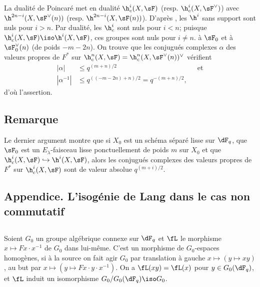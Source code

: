 La dualité de Poincaré met en dualité $\h_c^i(X,\sF)$ (resp. 
$\h_c^i(X,\sF^\vee)$) avec $\h^{2n-i}(X,\sF^\vee(n))$ (resp. 
$\h^{2n-i}(X,\sF(n))$). D'après , les $\h^i$ sans support 
sont nuls pour $i>n$. Par dualité, les $\h_c^i$ sont nuls pour $i<n$; puisque 
$\h_c^i(X,\sF) \iso \h^i(X,\sF)$, ces groupes sont nuls pour $i\ne n$. 
 à $\sF_0$ et à $\sF_0^\vee(n)$ (de poids 
$-m-2n$). On trouve que les conjugués complexes $\alpha$ des valeurs propres 
de $F^\ast$ sur $\h_c^n(X,\sF) = \h_c^n(X,\sF^\vee(n))^\vee$ vérifient 
\begin{align*}
  |\alpha| &\leqslant q^{(m+n)/2} && \text{et} \\
  |\alpha^{-1}| &\leqslant q^{((-m-2n)+n)/2} = q^{-(m+n)/2} \text{,}
\end{align*}
d'où l'assertion. 





\subsection{Remarque}\label{VI:1-21}

Le dernier argument montre que si $X_0$ est un schéma séparé lisse sur 
$\dF_q$, que $\sF_0$ est un $E_\lambda$-faisceau lisse ponctuellement de poids 
$m$ sur $X_0$ et que $\h_c^i(X,\sF) \hookrightarrow \h^i(X,\sF)$, alors les 
conjugués complexes des valeurs propres de $F^\ast$ sur $\h_c^i(X,\sF)$ sont 
de valeur absolue $q^{(m+i)/2}$. 






\subsection*{Appendice. L'isogénie de Lang dans le cas non commutatif}




\subsection{}\label{VI:1-22}

Soient $G_0$ un groupe algébrique connexe sur $\dF_q$ et $\fL$ le morphisme 
$x\mapsto F x\cdot x^{-1}$ de $G_0$ dans lui-même. C'est un morphisme de 
$G_0$-espaces homogènes, si à la source on fait agir $G_0$ par translation 
à gauche $x\mapsto (y\mapsto x y)$, au but par 
$x\mapsto (y\mapsto F x\cdot y\cdot x^{-1})$. On a $\fL(xy) = \fL(x)$ pour 
$y\in G_0(\dF_q)$, et $\fL$ induit un isomorphisme $G_0/G_0(\dF_q)\iso G_0$. 

